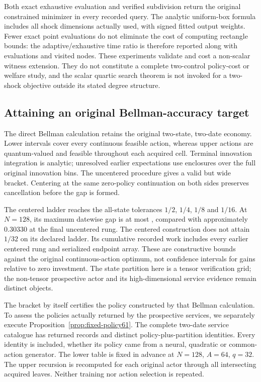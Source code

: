 

Both exact exhaustive evaluation and verified subdivision return the original constrained minimizer in every recorded query. The analytic uniform-box formula includes all shock dimensions actually used, with signed fitted output weights. Fewer exact point evaluations do not eliminate the cost of computing rectangle bounds: the adaptive/exhaustive time ratio is therefore reported along with evaluations and visited nodes. These experiments validate and cost a non-scalar witness extension. They do not constitute a complete two-control policy-cost or welfare study, and the scalar quartic search theorem is not invoked for a two-shock objective outside its stated degree structure.

\subsection{Attaining an original Bellman-accuracy target}
The direct Bellman calculation retains the original two-state, two-date economy. Lower intervals cover every continuous feasible action, whereas upper actions are quantum-valued and feasible throughout each acquired cell. Terminal innovation integration is analytic; unresolved earlier expectations use enclosures over the full original innovation bins. The uncentered procedure gives a valid but wide bracket. Centering at the same zero-policy continuation on both sides preserves cancellation before the gap is formed.



The centered ladder reaches the all-state tolerances $1/2$, $1/4$, $1/8$ and $1/16$. At $N=128$, its maximum datewise gap is at most \NBOCenteredGap{}, compared with approximately $0.30330$ at the final uncentered rung. The centered construction does not attain $1/32$ on its declared ladder. Its cumulative recorded work includes every earlier centered rung and serialized endpoint array. These are constructive bounds against the original continuous-action optimum, not confidence intervals for gains relative to zero investment. The state partition here is a tensor verification grid; the non-tensor prospective actor and its high-dimensional service evidence remain distinct objects.

The bracket by itself certifies the policy constructed by that Bellman calculation. To assess the policies actually returned by the prospective services, we separately execute Proposition~\ref{prop:fixed-policy61}. The complete two-date service catalogue has \NBOFixedAliases{} returned records and \NBOFixedActors{} distinct policy-plus-partition identities. Every identity is included, whether its policy came from a neural, quadratic or common-action generator. The lower table is fixed in advance at $N=128$, $A=64$, $q=32$. The upper recursion is recomputed for each original actor through all intersecting acquired leaves. Neither training nor action selection is repeated.

